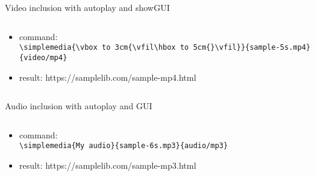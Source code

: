 
    \begin{frame}{Video inclusion with autoplay and showGUI}
        \begin{columns}
            \begin{column}[t]{128mm}
            \begin{itemize}
                \item command:\\
                \scriptsize 
                \texttt{\textbackslash{}simplemedia\{\textbackslash{}vbox to 3cm\{\textbackslash{}vfil\textbackslash{}hbox to 5cm\{\}\textbackslash{}vfil\}\}\{sample-5s.mp4\}\{video/mp4\}}
                \normalsize
                \item result:
                \hspace{0.5cm}\tiny{}https://samplelib.com/sample-mp4.html
            \end{itemize}
        \end{column}
    \end{columns}
\end{frame}


    \begin{frame}{Audio inclusion with autoplay and GUI}
        \begin{columns}
            \begin{column}[t]{128mm}
                \begin{itemize}
                    \item command:\\
                    \scriptsize 
                    \texttt{\textbackslash{}simplemedia\{My audio\}\{sample-6s.mp3\}\{audio/mp3\}}
                    \normalsize
                    \item result:
                    \hspace{0.5cm}\tiny{}https://samplelib.com/sample-mp3.html
                \end{itemize}
            \end{column}
        \end{columns}
    \end{frame}

